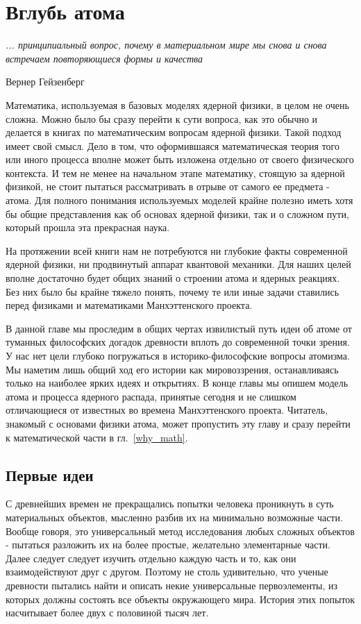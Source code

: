 \chapter{Вглубь атома}

\epigraph{\emph{... принципиальный вопрос, почему в материальном мире мы снова и снова встречаем повторяющиеся формы и качества}}
{Вернер Гейзенберг}

Математика, используемая в базовых моделях ядерной физики, в целом не очень сложна.
Можно было бы сразу перейти к сути вопроса, как это обычно и делается в книгах по математическим вопросам ядерной физики.
Такой подход имеет свой смысл.
Дело в том, что оформившаяся математическая теория того или иного процесса вполне может быть изложена отдельно от своего физического контекста.
И тем не менее на начальном этапе математику, стоящую за ядерной физикой, не стоит пытаться рассматривать в отрыве от самого ее предмета - атома.
Для полного понимания используемых моделей крайне полезно иметь хотя бы общие представления как об основах ядерной физики, так и о сложном пути, который прошла эта прекрасная наука.

На протяжении всей книги нам не потребуются ни глубокие факты современной ядерной физики, ни продвинутый аппарат квантовой механики.
Для наших целей вполне достаточно будет общих знаний о строении атома и ядерных реакциях.
Без них было бы крайне тяжело понять, почему те или иные задачи ставились перед физиками и математиками Манхэттенского проекта.

В данной главе мы проследим в общих чертах извилистый путь идеи об атоме от туманных философских догадок древности вплоть до современной точки зрения. 
У нас нет цели глубоко погружаться в историко-философские вопросы атомизма.
Мы наметим лишь общий ход его истории как мировоззрения, останавливаясь только на наиболее ярких идеях и открытиях.
В конце главы мы опишем модель атома и процесса ядерного распада, принятые сегодня и не слишком отличающиеся от известных во времена Манхэттенского проекта.
Читатель, знакомый с основами физики атома, может пропустить эту главу и сразу перейти к математической части в гл.~\ref{why_math}.


\section*{Первые идеи}

С древнейших времен не прекращались попытки человека проникнуть в суть материальных объектов, мысленно разбив их на минимально возможные части.
Вообще говоря, это универсальный метод исследования любых сложных объектов - пытаться разложить их на более простые, желательно элементарные части. 
Далее следует следует изучить отдельно каждую часть и то, как они взаимодействуют друг с другом.
Поэтому не столь удивительно, что ученые древности пытались найти и описать некие универсальные первоэлементы, из которых должны состоять все объекты окружающего мира.
История этих попыток насчитывает более двух с половиной тысяч лет.

